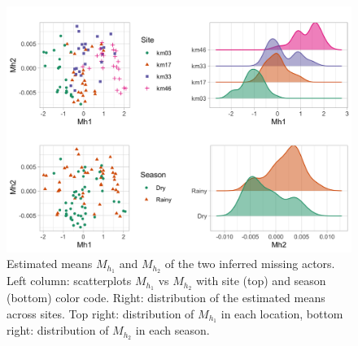  
\begin{figure}[h]
    \centering
    \includegraphics[width=12cm]{figs/Fatala_MH2.png}
    \caption{Estimated means $M_{h_1}$ and $M_{h_2}$ of the two inferred missing actors. Left column: scatterplots $M_{h_1}$ vs $M_{h_2}$ with site (top) and season (bottom) color code. Right: distribution of the estimated means across sites. Top right: distribution of $M_{h_1}$ in each location, bottom right: distribution of $M_{h_2}$ in each season.}
    \label{fig:Fatala}
\end{figure}

